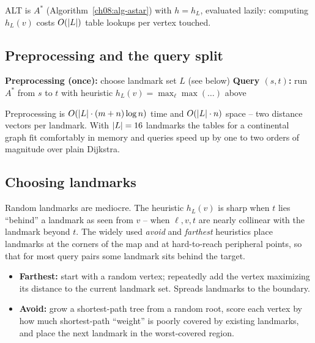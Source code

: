ALT is $A^*$ (Algorithm~\ref{ch08:alg-astar}) with $h=h_L$, evaluated
lazily: computing $h_L(v)$ costs $O(\lvert L\rvert)$ table lookups per vertex
touched.

\subsection{Preprocessing and the query split}

\begin{algorithm}[H]
\DontPrintSemicolon
{}
\textbf{Preprocessing (once):}\;
choose landmark set $L$ (see below)\;
\textbf{Query $(s,t)$:}\;
run $A^*$ from $s$ to $t$ with heuristic $h_L(v)=\max_{\ell}\max(\dots)$ above\;
\caption{ALT: preprocessing and query}
\label{ch08:alg-alt}
\end{algorithm}

Preprocessing is $O(\lvert L\rvert\cdot(m+n)\log n)$ time and $O(\lvert L\rvert\cdot n)$
space -- two distance vectors per landmark. With $\lvert L\rvert=16$ landmarks the
tables for a continental graph fit comfortably in memory and queries speed up by
one to two orders of magnitude over plain Dijkstra.

\subsection{Choosing landmarks}

Random landmarks are mediocre. The heuristic $h_L(v)$ is sharp when $t$ lies
``behind'' a landmark as seen from $v$ -- when $\ell, v, t$ are nearly collinear
with the landmark beyond $t$. The widely used \emph{avoid} and \emph{farthest}
heuristics place landmarks at the corners of the map and at hard-to-reach
peripheral points, so that for most query pairs some landmark sits behind the
target.

\begin{itemize}
  \item \textbf{Farthest:} start with a random vertex; repeatedly add the vertex
        maximizing its distance to the current landmark set. Spreads landmarks to
        the boundary.
  \item \textbf{Avoid:} grow a shortest-path tree from a random root, score each
        vertex by how much shortest-path ``weight'' is poorly covered by existing
        landmarks, and place the next landmark in the worst-covered region.
\end{itemize}

